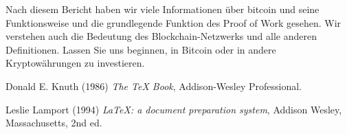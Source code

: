 \documentclass[ngerman]{scrreprt}
\begin{document}
Nach diesem Bericht haben wir viele Informationen über bitcoin und seine Funktionsweise und die grundlegende Funktion des Proof of Work gesehen. Wir verstehen auch die Bedeutung des Blockchain-Netzwerks und alle anderen Definitionen. Lassen Sie uns beginnen, in Bitcoin oder in andere Kryptowährungen zu investieren.\\

\begin{thebibliography}{9}
	Donald E. Knuth (1986) \emph{The \TeX{} Book}, Addison-Wesley Professional.
	
	Leslie Lamport (1994) \emph{\LaTeX: a document preparation system}, Addison
	Wesley, Massachusetts, 2nd ed.
\end{thebibliography}
\end{document}
